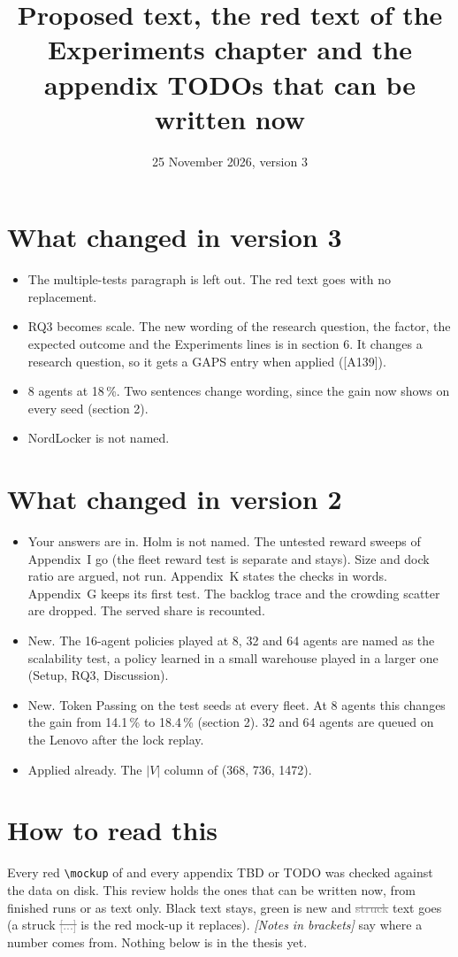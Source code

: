 \documentclass[11pt,a4paper]{article}
\title{Proposed text, the red text of the Experiments chapter and the appendix TODOs that can be written now}
\date{25 November 2026, version 3}
\newcommand{\new}[1]{\textcolor{newc}{#1}}
\newcommand{\old}[1]{\textcolor{gray}{\sout{#1}}}
\newcommand{\note}[1]{{\small\itshape [#1]}}
\newcommand{\lab}[1]{\textsf{\footnotesize\detokenize{#1}}}
\begin{document}
\sloppy
\maketitle

\section*{What changed in version 3}
\begin{itemize}[nosep]
  \item The multiple-tests paragraph is left out. The red text goes with no
    replacement.
  \item RQ3 becomes scale. The new wording of the research question, the
    factor, the expected outcome and the Experiments lines is in section 6.
    It changes a research question, so it gets a GAPS entry when applied
    ([A139]).
  \item 8 agents at 18\,\%. Two sentences change wording, since the gain now
    shows on every seed (section 2).
  \item NordLocker is not named.
\end{itemize}

\section*{What changed in version 2}
\begin{itemize}[nosep]
  \item Your answers are in. Holm is not named. The untested reward sweeps
    of Appendix~I go (the fleet reward test is separate and stays). Size and
    dock ratio are argued, not run. Appendix~K states the checks in words.
    Appendix~G keeps its first test. The backlog trace and the crowding
    scatter are dropped. The served share is recounted.
  \item New. The 16-agent policies played at 8, 32 and 64 agents are named
    as the scalability test, a policy learned in a small warehouse played in
    a larger one (Setup, RQ3, Discussion).
  \item New. Token Passing on the test seeds at every fleet. At 8 agents this
    changes the gain from 14.1\,\% to 18.4\,\% (section 2). 32 and 64 agents
    are queued on the Lenovo after the lock replay.
  \item Applied already. The $|V|$ column of \lab{tab:app:window} (368, 736,
    1472).
\end{itemize}

\section*{How to read this}
Every red \texttt{\textbackslash mockup} of \lab{5.Experiments.tex} and every
appendix TBD or TODO was checked against the data on disk. This review holds
the ones that can be written now, from finished runs or as text only. Black
text stays, \new{green} is new and \old{struck} text goes (a struck
\old{[...]} is the red mock-up it replaces). \note{Notes in brackets} say where
a number comes from. Nothing below is in the thesis yet.
\end{document}
